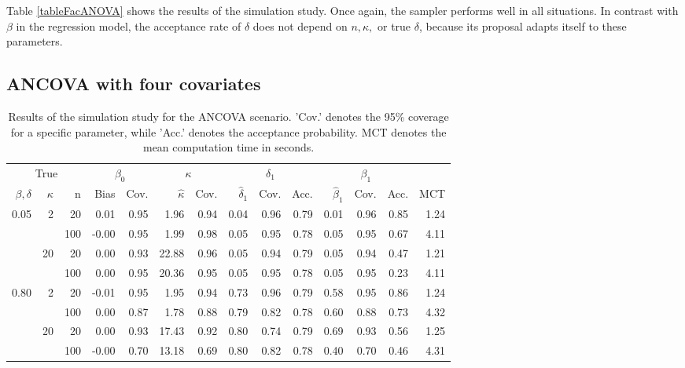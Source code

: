 Table \ref{tableFacANOVA} shows the results of the simulation study. Once again, the sampler performs well in all situations. In contrast with \( \beta \) in the regression model, the  acceptance rate of \( \delta \) does not depend on \( n, \kappa, \) or true \( \delta \),  because its proposal adapts itself to these parameters.

\subsection{ANCOVA with four covariates}

\begin{table}[btp]
\centering
\begin{scriptsize}
\caption{Results of the simulation study for the ANCOVA scenario. 'Cov.' denotes the 95\% coverage for a specific parameter, while 'Acc.' denotes the acceptance probability. MCT denotes the mean computation time in seconds.} 
\label{tableANCOVA}
\begin{tabular}{rrrrrrrrrrrrrr}
  \toprule \multicolumn{3}{c}{True} & \multicolumn{2}{c}{$\beta_0$} & \multicolumn{2}{c}{$\kappa$} & \multicolumn{3}{c}{$\delta_1$} & \multicolumn{3}{c}{$\beta_1$} \\  \cmidrule(lr){1-3} \cmidrule(lr){4-5} \cmidrule(lr){6-7} \cmidrule(lr){8-10} \cmidrule(lr){11-13}$\beta , \delta$ & $\kappa$ & n & Bias & Cov. & $\hat{\kappa}$ & Cov. & $\hat{\delta}_1$ & Cov. & Acc. & $\hat{\beta}_1$ & Cov. & Acc. & MCT \\ 
  \midrule
0.05 & 2 & 20 & 0.01 & 0.95 & 1.96 & 0.94 & 0.04 & 0.96 & 0.79 & 0.01 & 0.96 & 0.85 & 1.24 \\ 
   \vspace{0.2cm}  &  & 100 & -0.00 & 0.95 & 1.99 & 0.98 & 0.05 & 0.95 & 0.78 & 0.05 & 0.95 & 0.67 & 4.11 \\ 
   & 20 & 20 & 0.00 & 0.93 & 22.88 & 0.96 & 0.05 & 0.94 & 0.79 & 0.05 & 0.94 & 0.47 & 1.21 \\ 
   \vspace{0.2cm}  &  & 100 & 0.00 & 0.95 & 20.36 & 0.95 & 0.05 & 0.95 & 0.78 & 0.05 & 0.95 & 0.23 & 4.11 \\ 
  0.80 & 2 & 20 & -0.01 & 0.95 & 1.95 & 0.94 & 0.73 & 0.96 & 0.79 & 0.58 & 0.95 & 0.86 & 1.24 \\ 
   \vspace{0.2cm}  &  & 100 & 0.00 & 0.87 & 1.78 & 0.88 & 0.79 & 0.82 & 0.78 & 0.60 & 0.88 & 0.73 & 4.32 \\ 
   & 20 & 20 & 0.00 & 0.93 & 17.43 & 0.92 & 0.80 & 0.74 & 0.79 & 0.69 & 0.93 & 0.56 & 1.25 \\ 
   &  & 100 & -0.00 & 0.70 & 13.18 & 0.69 & 0.80 & 0.82 & 0.78 & 0.40 & 0.70 & 0.46 & 4.31 \\ 
   \bottomrule
\end{tabular}
\end{scriptsize}
\end{table}


